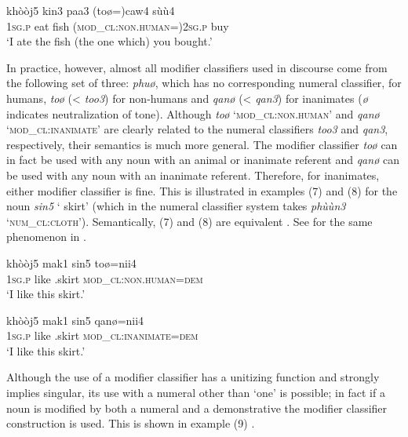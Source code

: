 \documentclass[output=paper]{langsci/langscibook}
\begin{document}
    \gll   khòòj5  kin3  paa3  (toø=)caw4                sùù4\\
	 \textsc{1sg.p} eat    fish  (\textsc{mod\_cl}:\textsc{non.human}=)\textsc{2sg.p}    buy\\
    \glt  ‘I ate the fish (the one which) you bought.’
    \z

  In practice, however, almost all modifier classifiers used in discourse come from the following set of three: \textit{phuø}, which has no corresponding numeral classifier, for humans, \textit{toø} ({\textless} \textit{too3}) for non-humans and \textit{qanø} ({\textless} \textit{qan3}) for inanimates (\textit{ø} indicates neutralization of tone). Although \textit{toø} ‘\textsc{mod\_cl}:\textsc{non.human}’ and \textit{qanø} ‘\textsc{mod\_cl}:\textsc{inanimate}’ are clearly related to the numeral classifiers \textit{too3} and \textit{qan3}, respectively, their semantics is much more general. The modifier classifier \textit{toø} can in fact be used with any noun with an animal or inanimate referent and \textit{qanø} can be used with any noun with an inanimate referent. Therefore, for inanimates, either modifier classifier is fine. This is illustrated in examples (7) and (8) for the noun \textit{sin5} ‘ skirt’ (which in the numeral classifier system takes \textit{phùùn3} ‘\textsc{num\_cl:cloth}’). Semantically, (7) and (8) are equivalent \citep[141]{Enfield2007}. See \citet{Carpenter1986,Carpenter1991} for the same phenomenon in .

\ea%
    \label{ex:fc:7}
    \gll    khòòj5  mak1    sin5      toø=nii4\\
	    \textsc{1sg.p} like\textsc{  }  .skirt  \textsc{mod\_cl}:\textsc{non.human}=\textsc{dem}\\
    \glt ‘I like this skirt.’
    \z

\ea%
    \label{ex:fc:8}
    \gll    khòòj5  mak1    sin5      qanø=nii4\\
    \textsc{1sg.p} like\textsc{  }  .skirt  \textsc{mod\_cl}:\textsc{inanimate}=\textsc{dem}	\\
    \glt  ‘I like this skirt.’
    \z

Although the use of a modifier classifier has a unitizing function and strongly implies singular, its use with a numeral other than ‘one’ is possible; in fact if a noun is modified by both a numeral and a demonstrative the modifier classifier construction is used. This is shown in example (9) \citep[140]{Enfield2007}.
\end{document}
